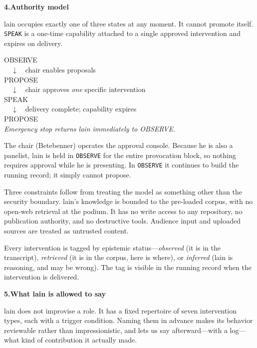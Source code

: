 \documentclass[11pt]{article}
\newcommand{\fieldlabel}[2][]{%
  \par\addvspace{1.25em}\Needspace{8\baselineskip}%
  \noindent\begin{minipage}{\linewidth}%
    {\NotoHeading\bfseries\large\color{ContentPrimary}#2}%
    \hfill{\normalfont\footnotesize\color{ContentSecondary}#1}%
  \end{minipage}\par
  \vspace{0.2em}{\color{BorderModerate}\rule{\linewidth}{0.4pt}}\par
  \vspace{0.55em}%
}
\begin{document}
\fieldlabel{4.\quad Authority model}

lain occupies exactly one of three states at any moment. It cannot promote
itself. \texttt{SPEAK} is a one-time capability attached to a single
approved intervention and expires on delivery.

\vspace{0.3em}
\begin{tcolorbox}[colback=SurfaceCode, colframe=BorderCode, boxrule=0.4pt,
                  arc=2pt, left=10pt, right=10pt, top=8pt, bottom=8pt]
\ttfamily\footnotesize
OBSERVE\\
\phantom{ }\ \ $\downarrow$\ \ chair enables proposals\\
PROPOSE\\
\phantom{ }\ \ $\downarrow$\ \ chair approves \emph{one} specific intervention\\
SPEAK\\
\phantom{ }\ \ $\downarrow$\ \ delivery complete; capability expires\\
PROPOSE\\[0.5em]
\normalfont\itshape Emergency stop returns lain immediately to OBSERVE.
\end{tcolorbox}

\vspace{0.3em}

The chair (Betebenner) operates the approval console. Because he is also a
panelist, lain is held in \texttt{OBSERVE} for the entire provocation block, so nothing requires approval while he is presenting. In
\texttt{OBSERVE} it continues to build the running record; it simply cannot
propose.

Three constraints follow from treating the model as something other than the
security boundary. lain's knowledge is bounded to the pre-loaded corpus, with no
open-web retrieval at the podium. It has no write access to any repository, no
publication authority, and no destructive tools. Audience input and uploaded
sources are treated as untrusted content.

Every intervention is tagged by epistemic status---\emph{observed} (it is in
the transcript), \emph{retrieved} (it is in the corpus, here is where), or
\emph{inferred} (lain is reasoning, and may be wrong). The tag is visible
in the running record when the intervention is delivered.

\fieldlabel{5.\quad What lain is allowed to say}

lain does not improvise a role. It has a fixed repertoire of seven intervention
types, each with a trigger condition. Naming them in advance makes its behavior
reviewable rather than impressionistic, and lets us say afterward---with a
log---what kind of contribution it actually made.
\end{document}
